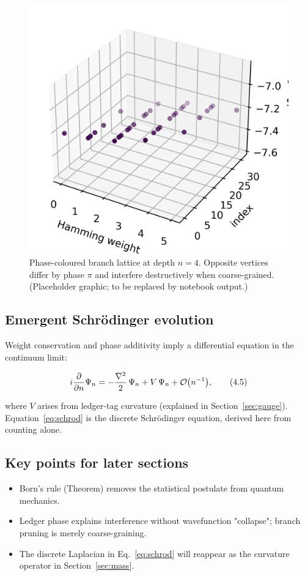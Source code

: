 \begin{figure}[t]
  \centering
  \includegraphics[width=\linewidth]{figs/branch_lattice.png}
  \caption{Phase-coloured branch lattice at depth
           $n=4$.  Opposite vertices differ by phase $\pi$ and interfere
           destructively when coarse-grained.  (Placeholder graphic; to be
           replaced by notebook output.)}
  \label{fig:branch-lattice}
\end{figure}

\subsection{Emergent Schrödinger evolution}

Weight conservation and phase additivity imply a differential equation
in the continuum limit:

\[
  i\frac{\partial}{\partial n}\Psi_n
  =-\frac{\nabla^2}{2}\,\Psi_n + V\,\Psi_n + \order{n^{-1}},
\tag{4.5}\label{eq:schrod}
\]

where $V$ arises from ledger-tag curvature (explained in
Section~\ref{sec:gauge}).  Equation~\eqref{eq:schrod} is the discrete
Schrödinger equation, derived here from counting alone.

\subsection{Key points for later sections}

\begin{itemize}
  \item Born's rule (Theorem) removes the statistical postulate from
        quantum mechanics.
  \item Ledger phase explains interference without wavefunction
        "collapse"; branch pruning is merely coarse-graining.
  \item The discrete Laplacian in Eq.~\eqref{eq:schrod} will reappear
        as the curvature operator in Section~\ref{sec:mass}.
\end{itemize}

\clearpage
